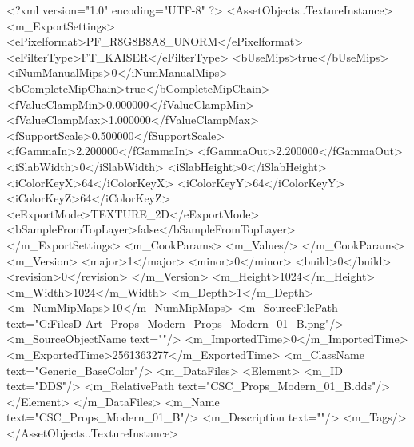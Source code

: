 <?xml version="1.0" encoding="UTF-8" ?>
<AssetObjects..TextureInstance>
	<m_ExportSettings>
		<ePixelformat>PF_R8G8B8A8_UNORM</ePixelformat>
		<eFilterType>FT_KAISER</eFilterType>
		<bUseMips>true</bUseMips>
		<iNumManualMips>0</iNumManualMips>
		<bCompleteMipChain>true</bCompleteMipChain>
		<fValueClampMin>0.000000</fValueClampMin>
		<fValueClampMax>1.000000</fValueClampMax>
		<fSupportScale>0.500000</fSupportScale>
		<fGammaIn>2.200000</fGammaIn>
		<fGammaOut>2.200000</fGammaOut>
		<iSlabWidth>0</iSlabWidth>
		<iSlabHeight>0</iSlabHeight>
		<iColorKeyX>64</iColorKeyX>
		<iColorKeyY>64</iColorKeyY>
		<iColorKeyZ>64</iColorKeyZ>
		<eExportMode>TEXTURE_2D</eExportMode>
		<bSampleFromTopLayer>false</bSampleFromTopLayer>
	</m_ExportSettings>
	<m_CookParams>
		<m_Values/>
	</m_CookParams>
	<m_Version>
		<major>1</major>
		<minor>0</minor>
		<build>0</build>
		<revision>0</revision>
	</m_Version>
	<m_Height>1024</m_Height>
	<m_Width>1024</m_Width>
	<m_Depth>1</m_Depth>
	<m_NumMipMaps>10</m_NumMipMaps>
	<m_SourceFilePath text="C:\Users\Shadow\Desktop\Working Files\3D Art\Textures\CSC_Props_Modern\Current\textures\CSC_Props_Modern_01_B.png"/>
	<m_SourceObjectName text=""/>
	<m_ImportedTime>0</m_ImportedTime>
	<m_ExportedTime>2561363277</m_ExportedTime>
	<m_ClassName text="Generic_BaseColor"/>
	<m_DataFiles>
		<Element>
			<m_ID text="DDS"/>
			<m_RelativePath text="CSC_Props_Modern_01_B.dds"/>
		</Element>
	</m_DataFiles>
	<m_Name text="CSC_Props_Modern_01_B"/>
	<m_Description text=""/>
	<m_Tags/>
</AssetObjects..TextureInstance>

